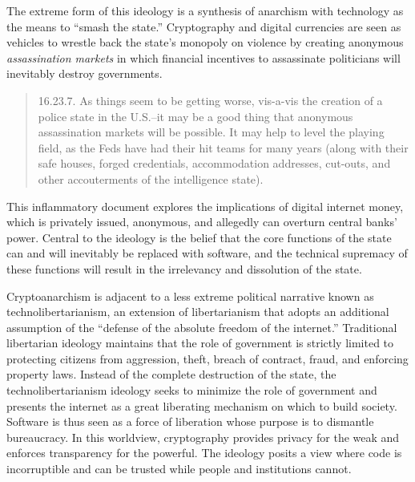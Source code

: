 
The extreme form of this ideology is a synthesis of anarchism with technology as
the means to ``smash the state.'' Cryptography and digital currencies are seen
as vehicles to wrestle back the state's monopoly on violence by creating
anonymous \textit{assassination markets} in which financial incentives to
assassinate politicians will inevitably destroy governments.


\begin{quote}
16.23.7. As things seem to be getting worse, vis-a-vis the creation of a
police state in the U.S.--it may be a good thing that anonymous
assassination markets will be possible. It may help to level the playing
field, as the Feds have had their hit teams for many years (along with
their safe houses, forged credentials, accommodation addresses,
cut-outs, and other accouterments of the intelligence state).
\end{quote}

This inflammatory document explores the implications of digital internet money,
which is privately issued, anonymous, and allegedly can overturn central banks'
power. Central to the ideology is the belief that the core functions of the
state can and will inevitably be replaced with software, and the technical
supremacy of these functions will result in the irrelevancy and dissolution of
the state.

Cryptoanarchism is adjacent to a less extreme political narrative known as
technolibertarianism, an extension of libertarianism that adopts an additional
assumption of the ``defense of the absolute freedom of the internet.''
Traditional libertarian ideology maintains that the role of government is
strictly limited to protecting citizens from aggression, theft, breach of
contract, fraud, and enforcing property laws. Instead of the complete
destruction of the state, the technolibertarianism ideology seeks to minimize
the role of government and presents the internet as a great liberating mechanism
on which to build society.  Software is thus seen as a force of liberation whose
purpose is to dismantle bureaucracy. In this worldview, cryptography provides
privacy for the weak and enforces transparency for the powerful.
\cite{assange_cypherpunks_2016} The ideology posits a view where code is
incorruptible and can be trusted while people and institutions cannot.
\cite{krugman_brutal_2021}

